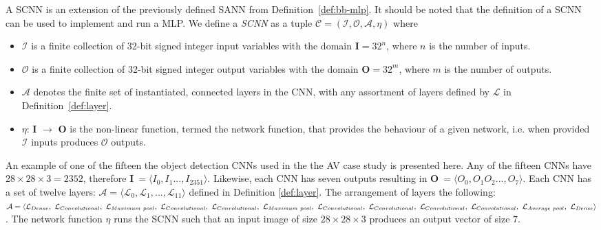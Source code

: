 \begin{definition}[\ac{SCNN}]
	\label{def:cnn}
	A \ac{SCNN} is an extension of the previously defined \ac{SANN} from Definition~\ref{def:bb-mlp}. 
	It should be noted that the definition of a \ac{SCNN} can be used to implement and run a \acf{MLP}.
	We define a \emph{\ac{SCNN}} as a tuple $\mathcal{C} = (\mathcal{I}, \mathcal{O}, \mathcal{A}, \eta)$ where
	\begin{itemize}
		\item $\mathcal{I}$ is a finite collection of 32-bit signed integer input variables with the domain \textbf{I}$ = 32^n$, where $n$ is the number of inputs.
		\item $\mathcal{O}$ is a finite collection of 32-bit signed integer output variables with the domain \textbf{O}$ = 32^m$, where $m$ is the number of outputs.
		\item $\mathcal{A}$ denotes the finite set of instantiated, connected layers in the \ac{CNN}, with any assortment of layers defined by $\mathcal{L}$ in Definition~\ref{def:layer}.
		\item $\eta$: \textbf{I} $\rightarrow$ \textbf{O} is the non-linear function, termed the network function, that provides the behaviour of a given network, i.e. when provided $\mathcal{I}$ inputs produces $\mathcal{O}$ outputs. 
	\end{itemize}
\end{definition}

\begin{example}
	\label{ex:cnn}
	An example of one of the fifteen the object detection \acp{CNN} used in the the \ac{AV} case study is presented here.
	Any of the fifteen \acp{CNN} have $28 \times 28 \times 3 = 2352$, therefore \textbf{I}$~= \langle I_0, I_1 ..., I_2351 \rangle$.
	Likewise, each CNN has seven outputs resulting in \textbf{O}$~= \langle O_0, O_1 O_2 ..., O_7 \rangle$.
	Each \ac{CNN} has a set of twelve layers: $\mathcal{A} = \langle\mathcal{L}_0, \mathcal{L}_1, ..., \mathcal{L}_{11}\rangle$ defined in Definition \ref{def:layer}.
	The arrangement of layers the following: $\mathcal{A} = \langle\mathcal{L}_{Dense}, ~\mathcal{L}_{Convolutional},\\~\mathcal{L}_{Maximum~pool}, ~\mathcal{L}_{Convolutional},~\mathcal{L}_{Convolutional}, ~\mathcal{L}_{Maximum~pool},~\mathcal{L}_{Convolutional},~\mathcal{L}_{Convolutional},\\~\mathcal{L}_{Convolutional},~\mathcal{L}_{Convolutional},~\mathcal{L}_{Average~pool},~\mathcal{L}_{Dense}\rangle$.
	The network function $\eta$ runs the \ac{SCNN} such that an input image of size $28 \times 28 \times 3$ produces an output vector of size $7$.
\end{example}

